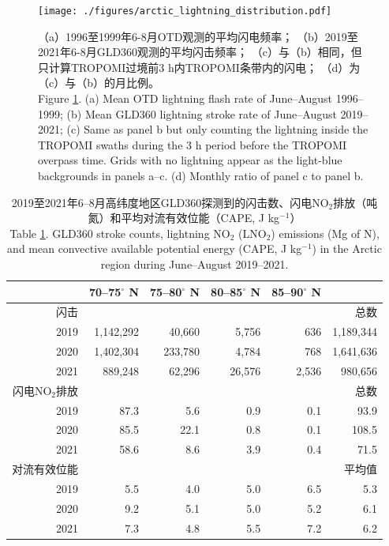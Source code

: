 \begin{figure}[!htbp]
\centering
\texttt{[image: ./figures/arctic\_lightning\_distribution.pdf]}
\caption{
（a）1996至1999年6-8月OTD观测的平均闪电频率；
（b）2019至2021年6-8月GLD360观测的平均闪击频率；
（c）与（b）相同，但只计算TROPOMI过境前3 h内TROPOMI条带内的闪电；
（d）为（c）与（b）的月比例。\\
Figure \ref{fig:arctic_lightning_distribution}.
(a) Mean OTD lightning flash rate of June--August 1996--1999;
(b) Mean GLD360 lightning stroke rate of June--August 2019--2021;
(c) Same as panel b but only counting the lightning inside the TROPOMI swaths during the 3 h period before the TROPOMI overpass time.
Grids with no lightning appear as the light-blue backgrounds in panels a--c.
(d) Monthly ratio of panel c to panel b.
}
\label{fig:arctic_lightning_distribution}
\end{figure}

\begin{table}
\centering
\caption{2019至2021年6--8月高纬度地区GLD360探测到的闪击数、闪电NO$_2$排放（吨氮）和平均对流有效位能（CAPE, J kg$^{-1}$）\\
Table \ref{table:arctic_emission}. GLD360 stroke counts, lightning NO$_2$ (LNO$_2$) emissions (Mg of N), and mean
convective available potential energy (CAPE, J kg$^{-1}$) in the Arctic region during June--August 2019--2021.
}
\label{table:arctic_emission}
\footnotesize
\begin{tabular}{rrrrrr}
\hline
{} & 70--75$^{\circ}$ N & 75--80$^{\circ}$ N &
80--85$^{\circ}$ N &  85--90$^{\circ}$ N &  \\
\hline
闪击 & & & & & 总数 \\
\hline
2019 &   1,142,292 &     40,660 &      5,756 &       636  & 1,189,344 \\
2020 &   1,402,304 &    233,780 &      4,784 &       768  &  1,641,636 \\
2021 &     889,248 &     62,296 &     26,576 &      2,536  &  980,656 \\
\hline
闪电NO$_2$排放 & & & & & 总数 \\
\hline
2019 &      87.3 &       5.6 &       0.9 &       0.1 &   93.9 \\
2020 &      85.5 &      22.1 &       0.8 &       0.1 &  108.5 \\
2021 &      58.6 &       8.6 &       3.9 &       0.4 &   71.5 \\
\hline
对流有效位能 & & & & & 平均值 \\
\hline
2019 & 5.5  & 4.0  & 5.0  & 6.5 & 5.3 \\
2020 & 9.2  & 5.1  & 5.0  & 5.2 & 6.1 \\
2021 & 7.3  & 4.8  & 5.5  & 7.2 & 6.2 \\
\hline
\end{tabular}
\end{table}


